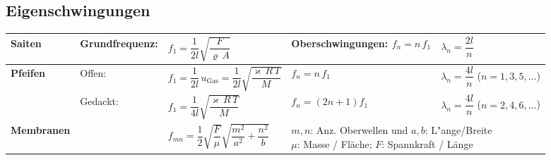 \subsection{Eigenschwingungen  }
\renewcommand{\arraystretch}{2.7}
\begin{tabular}{|l|llll|}
\hline
\textbf{Saiten}
	& Grundfrequenz: 
	& $ f_1=\dfrac{1}{2l}\sqrt{\dfrac{F}{\varrho\,A}}$
	& Oberschwingungen: $ f_n=n\, f_1$
	& $\lambda_n=\dfrac{2l}{n}$\\
\hline
\textbf{Pfeifen} & Offen:
 	& $f_1=\dfrac{1}{2l}\,u_{\text{Gas}}=\dfrac{1}{2l}\sqrt{\dfrac{\varkappa\,R\,T}{M}}$ 
	& $f_n=n\, f_1$
	& $\lambda_n=\dfrac{4l}{n}$ \quad ($n=1,3,5,...$) \\
& Gedackt: 
 	& $ f_1=\dfrac{1}{4l}\sqrt{\dfrac{\varkappa\,R\,T}{M}}$
	& $f_n=(2n+1) f_1$
	& $\lambda_n=\dfrac{4l}{n}$ \quad ($n=2,4,6,...$) \\ 
\hline
\textbf{Membranen}
 	& &
 	$f_{mn}=\dfrac{1}{2}\sqrt{\dfrac{F}{\mu}}\sqrt{\dfrac{m^2}{a^2}+\dfrac{n^2}{b}}$ 
	& \multicolumn{2}{l|}{\parbox{8cm}{$m,n$: Anz. Oberwellen und $a,b$:
	L"ange/Breite \\
	$\mu$: Masse / Fläche; $F$: Spannkraft / Länge}} \\ \hline
\end{tabular}
\newpage

